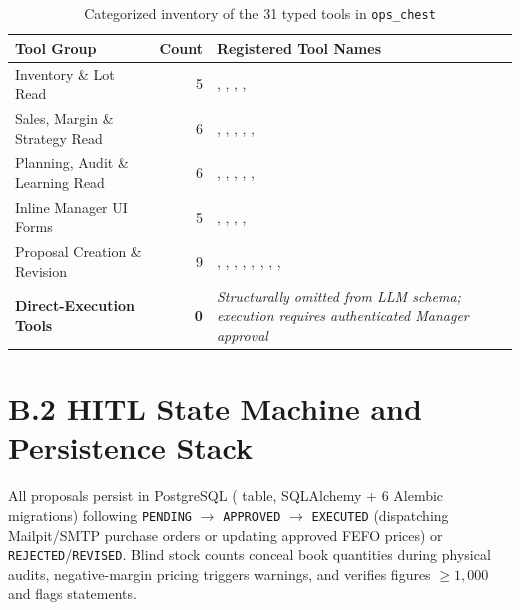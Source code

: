 \begin{table}[H]
\centering
\caption{Categorized inventory of the 31 typed tools in \texttt{ops\_chest}}
\label{tab:ops_tools}
\footnotesize
\begin{tabularx}{\textwidth}{L{3.2cm} r Y}
\toprule
\textbf{Tool Group} & \textbf{Count} & \textbf{Registered Tool Names} \\
\midrule
Inventory \& Lot Read & 5 & , , , ,  \\
Sales, Margin \& Strategy Read & 6 & , , , , ,  \\
Planning, Audit \& Learning Read & 6 & , , , , ,  \\
Inline Manager UI Forms & 5 & , , , ,  \\
Proposal Creation \& Revision & 9 & , , , , , , , ,  \\
\textbf{Direct-Execution Tools} & \textbf{0} & \textit{Structurally omitted from LLM schema; execution requires authenticated Manager approval} \\
\bottomrule
\end{tabularx}
\end{table}

\section*{B.2 HITL State Machine and Persistence Stack}
All proposals persist in PostgreSQL ( table, SQLAlchemy + 6 Alembic migrations) following \texttt{PENDING} $\to$ \texttt{APPROVED} $\to$ \texttt{EXECUTED} (dispatching Mailpit/SMTP purchase orders or updating approved FEFO prices) or \texttt{REJECTED}/\texttt{REVISED}. Blind stock counts conceal book quantities during physical audits, negative-margin pricing triggers warnings, and  verifies figures $\ge 1{,}000$ and flags  statements.

